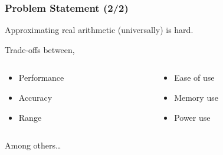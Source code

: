 \begin{frame}

\frametitle{Problem Statement (2/2)}

\vspace{\fill}

\begin{center}

Approximating real arithmetic (universally) is hard.

\end{center}

\vspace{\fill}

Trade-offs between,

\begin{columns}[t]

\begin{column}{0.5\textwidth}

\begin{itemize}

\item Performance

\item Accuracy

\item Range

\end{itemize}

\end{column}

\begin{column}{0.5\textwidth}

\begin{itemize}

\item Ease of use

\item Memory use

\item Power use

\end{itemize}

\end{column}

\end{columns}

\vspace{\fill}

Among others\ldots

\vspace{\fill}


\end{frame}
